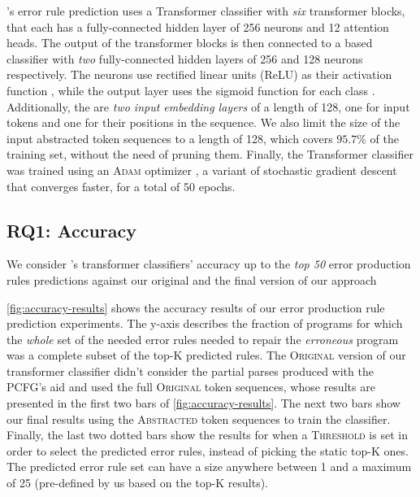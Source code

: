 \toolname's error rule prediction uses a Transformer classifier with \emph{six}
transformer blocks, that each has a fully-connected hidden layer of 256 neurons
and 12 attention heads. The output of the transformer blocks is then connected
to a \dnn based classifier with \emph{two} fully-connected hidden layers of 256
and 128 neurons respectively. The neurons use rectified linear units (ReLU) as
their activation function \citep{Nair2010-xg}, while the output layer uses the
sigmoid function for each class \citep{Nielsen2015-pu}. Additionally, the are
\emph{two input embedding layers} of a length of 128, one for input tokens and
one for their positions in the sequence. We also limit the size of the input
abstracted token sequences to a length of 128, which covers $95.7\%$ of the
training set, without the need of pruning them. Finally, the Transformer
classifier was trained using an \textsc{Adam} optimizer \citep{Kingma2014-ng}, a
variant of stochastic gradient descent that converges faster, for a total of 50
epochs.

\subsection{RQ1: Accuracy}
\label{sec:eval:accuracy}

We consider \toolname's transformer classifiers' accuracy up to the \emph{top
50} error production rules predictions against our original and the final
version of our approach



%
\autoref{fig:accuracy-results} shows the accuracy results of our error
production rule prediction experiments. The y-axis describes the fraction of
programs for which the \emph{whole} set of the needed error rules needed to
repair the \emph{erroneous} program was a complete subset of the top-K predicted
rules.
%
The \textsc{Original} version of our transformer classifier didn't consider the
partial parses produced with the PCFG's aid and used the full \textsc{Original}
token sequences, whose results are presented in the first two bars of
\autoref{fig:accuracy-results}. The next two bars show our final results using
the \textsc{Abstracted} token sequences to train the classifier. Finally, the
last two dotted bars show the results for when a \textsc{Threshold} is set in
order to select the predicted error rules, instead of picking the static top-K
ones. The predicted error rule set can have a size anywhere between 1 and a
maximum of 25 (pre-defined by us based on the top-K results).

